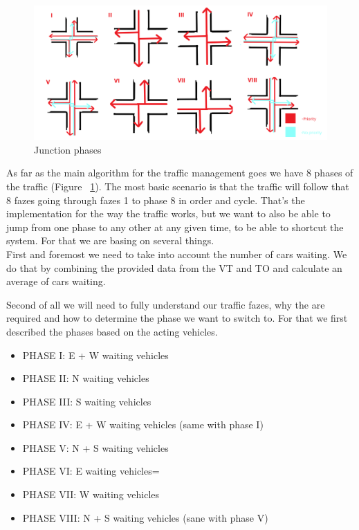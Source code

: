 \documentclass[17pt]{report}
\begin{document}
\begin{figure}[h!]
    \includegraphics[width=\textwidth]{Sketches/AvailableJunctionphases.png}
    \caption{Junction phases}
    \label{fig:Junction_phases}
\end{figure}

As far as the main algorithm for the traffic management goes we have 8 phases of
the traffic (Figure ~\ref{fig:Junction_phases}). The most basic scenario is that the 
traffic will follow that 8 fazes going through fazes 1 to phase 8 in order and cycle. That's
the implementation for the way the traffic works, but we want to also be
able to jump from one phase to any other at any given time, to be able to shortcut
the system. For that we are basing on several things.\\

\indent \indent
First and foremost we need to take into 
account the number of cars waiting. We do that by combining the provided data from the 
VT and TO and calculate an average of cars waiting.

\indent \indent
Second of all we will need to fully understand our traffic fazes, why the are required
and how to determine the phase we want to switch to. For that we first described the 
phases based on the acting vehicles.\\
\begin{itemize}
    \item PHASE I: E + W waiting vehicles
    \item PHASE II: N waiting vehicles
    \item PHASE III: S waiting vehicles
    \item PHASE IV: E + W waiting vehicles (same with phase I)
    \item PHASE V: N + S waiting vehicles
    \item PHASE VI: E waiting vehicles=
    \item PHASE VII: W waiting vehicles
    \item PHASE VIII: N + S waiting vehicles (sane with phase V)
\end{itemize}
\end{document}
